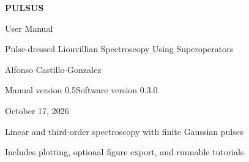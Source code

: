 \documentclass[10pt,letterpaper]{article}
\begin{document}
\hypersetup{pageanchor=false}
\begin{titlepage}
\thispagestyle{empty}
\vspace*{1.0in}
{\color{pulsusblue}\Huge\bfseries PULSUS\par}
\vspace{0.2in}
{\LARGE User Manual\par}
\vspace{0.3in}
{\large Pulse-dressed Liouvillian Spectroscopy Using Superoperators\par}
\vspace{0.7in}
{\large Alfonso Castillo-Gonzalez\par}
\vspace{0.15in}
Manual version 0.5\quad\textbullet\quad Software version 0.3.0\par
October 17, 2026\par
\vspace{0.25in}
Linear and third-order spectroscopy with finite Gaussian pulses\par
Includes plotting, optional figure export, and runnable tutorials\par
\vfill
\end{titlepage}

\hypersetup{pageanchor=true}
\tableofcontents
\clearpage
{}

\FloatBarrier

\FloatBarrier

\FloatBarrier

\FloatBarrier

\FloatBarrier

\FloatBarrier

\FloatBarrier

\FloatBarrier

\clearpage

\end{document}
